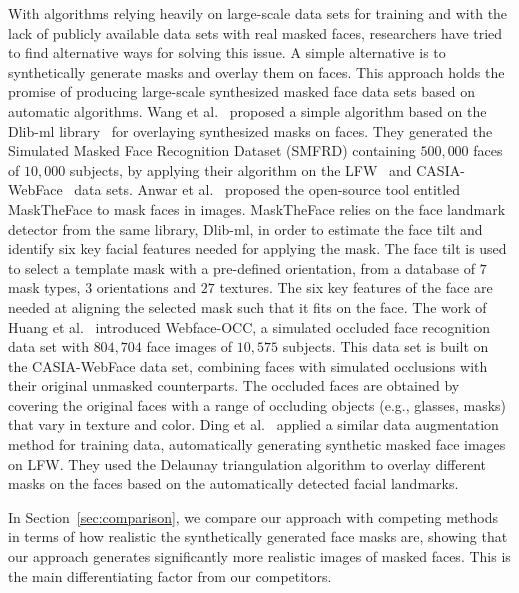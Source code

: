 \documentclass{article}
\begin{document}
With algorithms relying heavily on large-scale data sets for training and with the lack of publicly available data sets with real masked faces, researchers have tried to find alternative ways for solving this issue. A simple alternative is to synthetically generate masks and overlay them on faces. This approach holds the promise of producing large-scale synthesized masked face data sets based on automatic algorithms. 
Wang et al.~\cite{wang2020arxiv} proposed a simple algorithm based on the Dlib-ml library~\cite{dlib-ml} for overlaying synthesized masks on faces. They generated the Simulated Masked Face Recognition Dataset (SMFRD) containing $500,000$ faces of $10,000$ subjects, by applying their algorithm on the LFW~\cite{Huang07Tech} and CASIA-WebFace~\cite{yi2014learning} data sets. 
Anwar et al.~\cite{anwar2020arxiv} proposed the open-source tool entitled MaskTheFace to mask faces in images. MaskTheFace relies on the face landmark detector from the same library, Dlib-ml, in order to estimate the face tilt and identify six key facial features needed for applying the mask. The face tilt is used to select a template mask with a pre-defined orientation, from a database of $7$ mask types, $3$ orientations and $27$ textures. The six key features of the face are needed at aligning the selected mask such that it fits on the face. 
The work of Huang et al.~\cite{huang2021icassp} introduced Webface-OCC, a simulated occluded face recognition data set with $804,704$ face images of $10,575$ subjects. This data set is built on the CASIA-WebFace data set, combining faces with simulated occlusions  with their original unmasked counterparts. The occluded faces are obtained by covering the original faces with a range of occluding objects (e.g., glasses, masks) that vary in texture and color. 
Ding et al.~\cite{ding2020icm} applied a similar data augmentation method for training data, automatically generating synthetic masked face images on LFW. They used the Delaunay triangulation algorithm to overlay different masks on the faces based on the automatically detected facial landmarks. 

In Section~\ref{sec:comparison}, we compare our approach with competing methods~\cite{wang2020arxiv,anwar2020arxiv,huang2021icassp} in terms of how realistic the synthetically generated face masks are, showing that our approach generates significantly more realistic images of masked faces. This is the main differentiating factor from our competitors.
\end{document}
